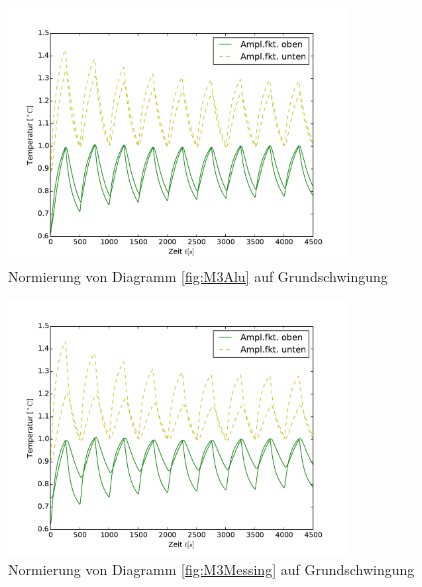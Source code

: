 \begin{figure}[htp]
	\label{fig:M3MessingNorm}
	\centering
	\includegraphics[width=0.8\textwidth]{Bilder/Normierungsauswahl/M3_Alu_norm.pdf}
	\caption{Normierung von Diagramm \ref{fig:M3Alu} auf Grundschwingung}
\end{figure}
\begin{figure}[htp]
	\label{fig:M3AluNorm}
	\centering
	\includegraphics[width=0.8\textwidth]{Bilder/Normierungsauswahl/M3_Messing_norm.pdf}
	\caption{Normierung von Diagramm \ref{fig:M3Messing} auf Grundschwingung}
\end{figure}
